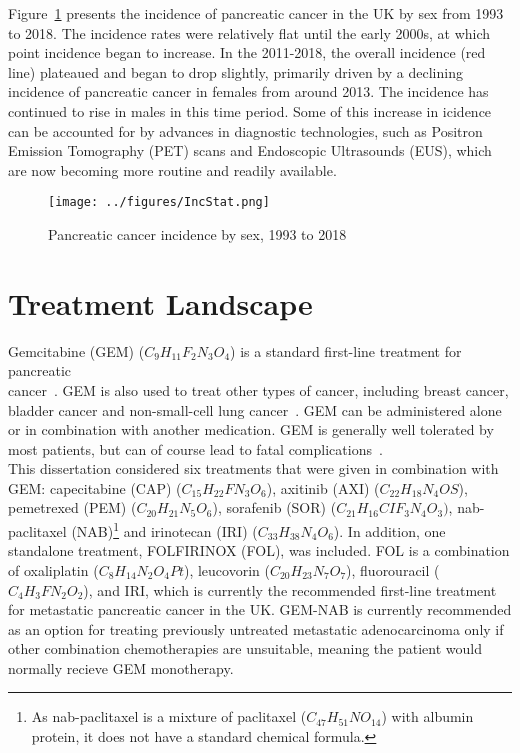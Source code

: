 Figure~\ref{pancInc} presents the incidence of pancreatic cancer in the UK by sex from 1993 to 2018. The incidence rates were relatively flat until the early 2000s, at which point incidence began to increase. In the 2011-2018, the overall incidence (red line) plateaued and began to drop slightly, primarily driven by a declining incidence of pancreatic cancer in females from around 2013. The incidence has continued to rise in males in this time period. Some of this increase in icidence can be accounted for by advances in diagnostic technologies, such as Positron Emission Tomography (PET) scans and Endoscopic Ultrasounds (EUS), which are now becoming more routine and readily available. \\

\begin{figure}[h]
    \centering
    \texttt{[image: ../figures/IncStat.png]}
    \caption{Pancreatic cancer incidence by sex, 1993 to 2018}
    \label{pancInc}
\end{figure}

\section{Treatment Landscape}
Gemcitabine (GEM) ($C_9H_{11}F_2N_3O_4$) is a standard first-line treatment for pancreatic\\ cancer~\cite{TA25}. GEM is also used to treat other types of cancer, including breast cancer, bladder cancer and non-small-cell lung cancer~\cite{wong2009}. GEM can be administered alone or in combination with another medication. GEM is generally well tolerated by most patients, but can of course lead to fatal complications~\cite{hryciuk}.  \\

This dissertation considered six treatments that were given in combination with GEM: capecitabine (CAP) ($C_{15}H_{22}FN_3O_6$), axitinib (AXI) ($C_{22}H_{18}N_4OS$), pemetrexed (PEM) ($C_{20}H_{21}N_5O_6$), sorafenib (SOR) ($C_{21}H_{16}CIF_{3}N_4O_3)$, nab-paclitaxel (NAB)\footnote{As nab-paclitaxel is a mixture of paclitaxel ($C_{47}H_{51}NO_{14}$) with albumin protein, it does not have a standard chemical formula.} and irinotecan (IRI) ($C_{33}H_{38}N_4O_6$). In addition, one standalone treatment, FOLFIRINOX (FOL), was included. FOL is a combination of oxaliplatin ($C_{8}H_{14}N_{2}O_{4}Pt$), leucovorin ($C_{20}H_{23}N_{7}O_{7}$), fluorouracil ($C_{4}H_{3}FN_{2}O_{2}$), and IRI, which is currently the recommended first-line treatment for metastatic pancreatic cancer in the UK. GEM-NAB is currently recommended as an option for treating previously untreated metastatic adenocarcinoma only if other combination chemotherapies are unsuitable, meaning the patient would normally recieve GEM monotherapy.\\

